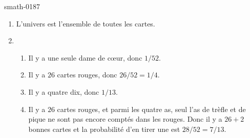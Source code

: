 
\begin{corrige}{smath-0187}

    \begin{enumerate}
        \item
            L'univers est l'ensemble de toutes les cartes.
        \item
            \begin{enumerate}
                \item
                    Il y a une seule dame de cœur, donc \( 1/52\).
                \item
                    Il y a \( 26\) cartes rouges, donc \( 26/52=1/4\).
                \item
                    Il y a quatre dix, donc \( 1/13\).
                \item
                    Il y a \( 26 \) cartes rouges, et parmi les quatre as, seul l'as de trèfle et de pique ne sont pas encore comptés dans les rouges. Donc il y a \( 26+2\) bonnes cartes et la probabilité d'en tirer une est \( 28/52=7/13\).
            \end{enumerate}
    \end{enumerate}

\end{corrige}
